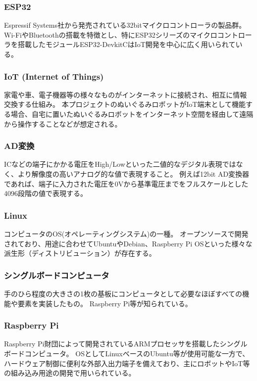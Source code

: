 \documentclass[uplatex,a4paper,12pt]{jsarticle}
\begin{document}
\subsubsection*{ESP32 \label{term:esp32}}
Espressif Systems社から発売されている32bitマイクロコントローラの製品群。
Wi-FiやBluetoothの搭載を特徴とし、特にESP32シリーズのマイクロコントローラを搭載したモジュールESP32-DevkitCはIoT開発を中心に広く用いられている。

\subsubsection*{IoT (Internet of Things) \label{term:iot}}
家電や車、電子機器等の様々なものがインターネットに接続され、相互に情報交換する仕組み。
本プロジェクトのぬいぐるみロボットがIoT端末として機能する場合、自宅に置いたぬいぐるみロボットをインターネット空間を経由して遠隔から操作することなどが想定される。


\subsubsection*{AD変換 \label{term:adc}}
ICなどの端子にかかる電圧をHigh/Lowといった二値的なデジタル表現ではなく、より解像度の高いアナログ的な値で表現すること。
例えば12bit AD変換器であれば、端子に入力された電圧を0Vから基準電圧までをフルスケールとした4096段階の値で表現する。

\subsubsection*{Linux \label{term:linux}}
コンピュータのOS(オペレーティングシステム)の一種。
オープンソースで開発されており、用途に合わせてUbuntuやDebian、Raspberry Pi OSといった様々な派生形（ディストリビューション）が存在する。


\subsubsection*{シングルボードコンピュータ \label{term:sbc}}
手のひら程度の大きさの1枚の基板にコンピュータとして必要なほぼすべての機能や要素を実装したもの。
Raspberry Pi等が知られている。

\subsubsection*{Raspberry Pi \label{term:raspi}}
Raspberry Pi財団によって開発されているARMプロセッサを搭載したシングルボードコンピュータ。
OSとしてLinuxベースのUbuntu等が使用可能な一方で、ハードウェア制御に便利な外部入出力端子を備えており、主にロボットやIoT等の組み込み用途の開発で用いられている。
\end{document}
